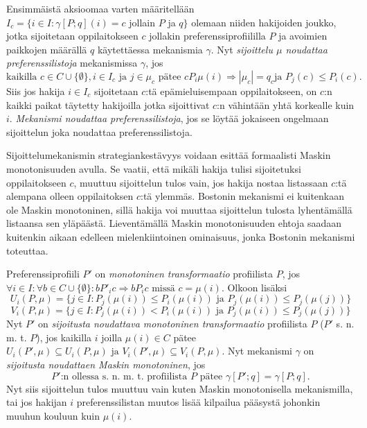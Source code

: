 \documentclass[gradu]{tktltiki}
\begin{document}
Ensimmäistä aksioomaa varten määritellään \\ \(I_c = \{i \in I :
\gamma [P;q](i) = c\) jollain \(P\) ja \(q\}\) olemaan niiden
hakijoiden joukko, jotka sijoitetaan oppilaitokseen \(c\) jollakin
preferenssiprofiililla \(P\) ja avoimien paikkojen määrällä \(q\)
käytettäessa mekanismia \(\gamma\). Nyt \emph{sijoittelu \(\mu\)
  noudattaa preferenssilistoja} mekanismissa \(\gamma\),
jos \[\text{kaikilla }c \in C \cup \{\emptyset\}, i \in I_c\text{ ja }
j \in \mu_c\text{ pätee }cP_{i}\mu(i) \Rightarrow |\mu_c| = q_c\text{
  ja }P_j(c) \leq P_i(c).\] Siis jos hakija \(i \in I_c\) sijoitetaan
\(c\):tä epämieluisempaan oppilaitokseen, on \(c\):n kaikki paikat
täytetty hakijoilla jotka sijoittivat \(c\):n vähintään yhtä korkealle
kuin \(i\). \emph{Mekanismi noudattaa preferenssilistoja}, jos se
löytää jokaiseen ongelmaan sijoittelun joka noudattaa
preferenssilistoja.

Sijoittelumekanismin strategiankestävyys voidaan esittää formaalisti
Maskin monotonisuuden avulla. Se vaatii, että mikäli hakija tulisi
sijoitetuksi oppilaitokseen \(c\), muuttuu sijoittelun tulos vain, jos
hakija nostaa listassaan \(c\):tä alempana olleen oppilaitoksen
\(c\):tä ylemmäs. Bostonin mekanismi ei kuitenkaan ole Maskin
monotoninen, sillä hakija voi muuttaa sijoittelun tulosta lyhentämällä
listaansa sen yläpäästä. Lieventämällä Maskin monotonisuuden ehtoja
saadaan kuitenkin aikaan edelleen mielenkiintoinen ominaisuus, jonka
Bostonin mekanismi toteuttaa.

Preferenssiprofiili \(P'\) on \emph{monotoninen transformaatio}
profiilista \(P\), jos \(\forall i \in I : \forall b \in C \cup
\{\emptyset\} : bP'_{i}c \Rightarrow bP_{i}c \text{ missä } c =
\mu(i)\). Olkoon lisäksi \[U_i(P,\mu) = \{j \in I : P_j(\mu (i)) \leq
P_i(\mu (i)) \text{ ja } P_j(\mu (i)) \leq P_j(\mu (j))\}\]
\[V_i(P,\mu) = \{j \in I : P_j(\mu (i)) < P_i(\mu (i)) \text{ ja } P_j(\mu
(i)) \leq P_j(\mu (j))\}\] Nyt \(P'\) on \emph{sijoitusta noudattava
  monotoninen transformaatio} profiilista \(P\) (\(P'\) s. n. m. t.
\(P\)), jos kaikilla \(i\) joilla \(\mu (i) \in C\) pätee
\(U_i(P',\mu) \subseteq U_i(P,\mu) \text{ ja } V_i(P',\mu) \subseteq
V_i(P,\mu)\). Nyt mekanismi \(\gamma\) on \emph{sijoitusta noudattaen
  Maskin monotoninen}, jos \[P'\text{:n ollessa s. n. m. t.
  profiilista }P \text{ pätee }\gamma [P';q] = \gamma [P;q].\] Nyt
siis sijoittelun tulos muuttuu vain kuten Maskin monotonisella
mekanismilla, tai jos hakijan \(i\) preferenssilistan muutos lisää
kilpailua pääsystä johonkin muuhun kouluun kuin \(\mu (i)\).
\end{document}
